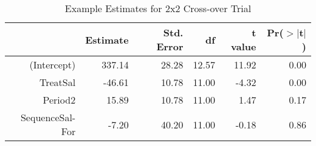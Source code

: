 \begin{table}[ht]
\centering
\begin{tabular}{r|rrrrr}
  \hline
 & Estimate & Std. Error & df & t value & Pr($>$$|$t$|$) \\ 
  \hline
(Intercept) & 337.14 & 28.28 & 12.57 & 11.92 & 0.00 \\ 
  TreatSal & -46.61 & 10.78 & 11.00 & -4.32 & 0.00 \\ 
  Period2 & 15.89 & 10.78 & 11.00 & 1.47 & 0.17 \\ 
  SequenceSal-For & -7.20 & 40.20 & 11.00 & -0.18 & 0.86 \\ 
   \hline
\end{tabular}
\caption{Example Estimates for 2x2 Cross-over Trial} 
\label{modelTable}
\end{table}

